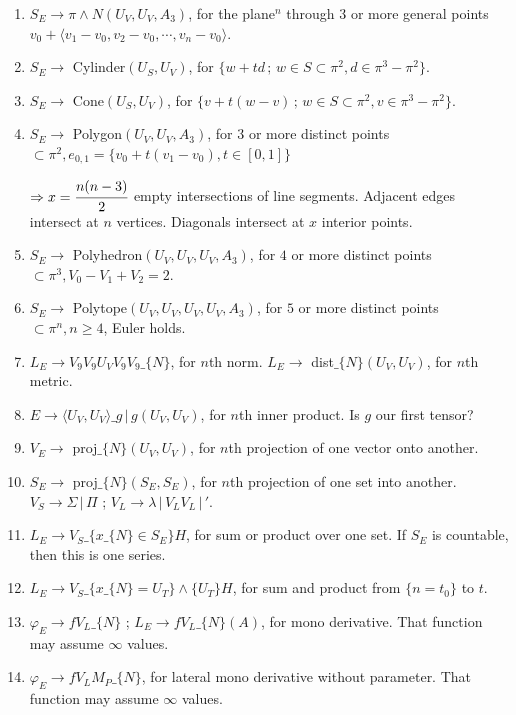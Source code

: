 \documentclass[11pt,a4paper]{article}
\newenvironment{myenum}
{ \begin{enumerate}
    \setlength{\itemsep}{0pt}
    \setlength{\parskip}{0pt}
    \setlength{\parsep}{0pt}     }
{ \end{enumerate}                  }
\begin{document}
\begin{myenum}
		\item $S_E \rightarrow \pi\wedge N(U_V, U_V, A_3)$, for the plane$^n$ through $3$ or more general points $v_0 + \langle v_1 - v_0, v_2 - v_0, \cdots, v_n - v_0 \rangle$.
		\item $S_E \rightarrow$ Cylinder$(U_S, U_V)$, for $\{w + t d\,;\,w \in S \subset \pi^2, d \in \pi^3 - \pi^2\}$.
		\item $S_E \rightarrow$ Cone$(U_S, U_V)$, for $\{v + t (w - v)\,;\,w \in S \subset \pi^2, v \in \pi^3 - \pi^2\}$.
		\item $S_E \rightarrow$ Polygon$(U_V, U_V, A_3)$, for $3$ or more distinct points $\subset \pi^2, e_{0,1} = \{v_0 + t(v_1 - v_0), t \in [0,1]\}$

		$\Rightarrow x = \cfrac{n(n-3)}{2}$ empty intersections of line segments. Adjacent edges intersect at $n$ vertices. Diagonals intersect at $x$ interior points.
		\item $S_E \rightarrow$ Polyhedron$(U_V, U_V, U_V, A_3)$, for $4$ or more distinct points $\subset \pi^3, V_0 - V_1 + V_2 = 2$.
		\item $S_E \rightarrow$ Polytope$(U_V, U_V, U_V, U_V, A_3)$, for $5$ or more distinct points $\subset \pi^n, n \ge 4$, Euler holds.
		\item $L_E \rightarrow V_9V_9U_VV_9V_9\_\{N\}$, for $n$th norm. $L_E \rightarrow$ dist$\_\{N\}(U_V, U_V)$, for $n$th metric.
		\item $E \rightarrow \langle U_V, U_V\rangle\_g\,|\, g(U_V, U_V)$, for $n$th inner product. Is $g$ our first tensor?
		\item $V_E \rightarrow$ proj$\_\{N\}(U_V, U_V)$, for $n$th projection of one vector onto another.
		\item $S_E \rightarrow$ proj$\_\{N\}(S_E, S_E)$, for $n$th projection of one set into another. $V_S \rightarrow \Sigma\,|\,\Pi$ ; $V_L \rightarrow \lambda\,|\,V_LV_L\,|\,'$.
		\item $L_E \rightarrow V_S\_\{x\_\{N\} \in S_E\} H$, for sum or product over one set. If $S_E$ is countable, then this is one series.
		\item $L_E \rightarrow V_S\_\{x\_\{N\} = U_T\}\wedge\{U_T\} H$, for sum and product from $\{n = t_0\}$ to $t$.
		\item $\varphi_E \rightarrow fV_L\_\{N\}$ ; $L_E \rightarrow fV_L\_\{N\}(A)$, for mono derivative. That function may assume $\infty$ values.
		\item $\varphi_E \rightarrow fV_LM_P\_\{N\}$, for lateral mono derivative without parameter. That function may assume $\infty$ values.

\end{myenum}
\end{document}

